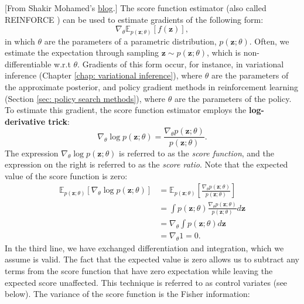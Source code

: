 [From Shakir Mohamed's \href{http://blog.shakirm.com/2015/11/machine-learning-trick-of-the-day-5-log-derivative-trick/}{blog}.] The score function estimator (also called REINFORCE \cite{williams1992simple}) can be used to estimate gradients of the following form:
\begin{equation}
    \nabla_\theta \mathbb{E}_{p(\mathbf{z}; \theta)} \left[ f(\mathbf{z}) \right],
    \nonumber
\end{equation}
in which $\theta$ are the parameters of a parametric distribution, $p(\mathbf{z}; \theta)$. Often, we estimate the expectation through sampling $\mathbf{z} \sim p(\mathbf{z}; \theta)$, which is non-differentiable w.r.t $\theta$. Gradients of this form occur, for instance, in variational inference (Chapter \ref{chap: variational inference}), where $\theta$ are the parameters of the approximate posterior, and policy gradient methods in reinforcement learning (Section \ref{sec: policy search methods}), where $\theta$ are the parameters of the policy. To estimate this gradient, the score function estimator employs the \textbf{log-derivative trick}:
\begin{equation}
    \nabla_\theta \log p(\mathbf{z}; \theta) = \frac{\nabla_\theta p(\mathbf{z}; \theta)}{p(\mathbf{z}; \theta)}.
\end{equation}
The expression $\nabla_\theta \log p(\mathbf{z}; \theta)$ is referred to as the \textit{score function}, and the expression on the right is referred to as the \textit{score ratio}. Note that the expected value of the score function is zero:
\begin{equation}
\begin{split}
    \mathbb{E}_{p(\mathbf{z}; \theta)} \left[ \nabla_\theta \log p(\mathbf{z}; \theta) \right] & = \mathbb{E}_{p(\mathbf{z}; \theta)} \left[ \frac{\nabla_\theta p(\mathbf{z}; \theta)}{p(\mathbf{z}; \theta)} \right] \\
    & = \int p(\mathbf{z}; \theta) \frac{\nabla_\theta p(\mathbf{z}; \theta)}{p(\mathbf{z}; \theta)} d \mathbf{z} \\
    & = \nabla_\theta \int p(\mathbf{z}; \theta) d \mathbf{z} \\
    & = \nabla_\theta 1 = 0.
\end{split}
\end{equation}
In the third line, we have exchanged differentiation and integration, which we assume is valid. The fact that the expected value is zero allows us to subtract any terms from the score function that have zero expectation while leaving the expected score unaffected. This technique is referred to as control variates (see below). The variance of the score function is the Fisher information:
